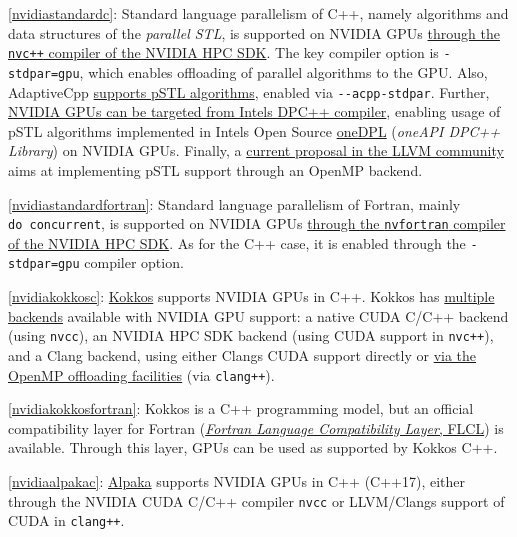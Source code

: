 \item \ref{nvidiastandardc}: Standard language parallelism of C++, namely algorithms and data structures of the \emph{parallel STL}, is supported on NVIDIA GPUs \href{https://docs.nvidia.com/hpc-sdk/compilers/c++-parallel-algorithms/index.html}{through the \texttt{nvc++} compiler of the NVIDIA HPC SDK}. The key compiler option is \texttt{-stdpar=gpu}, which enables offloading of parallel algorithms to the GPU. Also, AdaptiveCpp \href{https://github.com/AdaptiveCpp/AdaptiveCpp/blob/develop/doc/stdpar.md}{supports pSTL algorithms}, enabled via \texttt{-\/-acpp-stdpar}. Further, \href{https://intel.github.io/llvm-docs/GetStartedGuide.html\#build-dpc-toolchain-with-support-for-nvidia-cuda}{NVIDIA GPUs can be targeted from Intel\textquotesingle s DPC++ compiler}, enabling usage of pSTL algorithms implemented in Intel\textquotesingle s Open Source \href{https://github.com/oneapi-src/oneDPL}{oneDPL} (\emph{oneAPI DPC++ Library}) on NVIDIA GPUs. Finally, a \href{https://discourse.llvm.org/t/rfc-openmp-offloading-backend-for-c-parallel-algorithms/73468}{current proposal in the LLVM community} aims at implementing pSTL support through an OpenMP backend.
\item \ref{nvidiastandardfortran}: Standard language parallelism of Fortran, mainly \texttt{do\ concurrent}, is supported on NVIDIA GPUs \href{https://developer.nvidia.com/blog/accelerating-fortran-do-concurrent-with-gpus-and-the-nvidia-hpc-sdk/}{through the \texttt{nvfortran} compiler of the NVIDIA HPC SDK}. As for the C++ case, it is enabled through the \texttt{-stdpar=gpu} compiler option.
\item \ref{nvidiakokkosc}: \href{https://github.com/kokkos/kokkos}{Kokkos} supports NVIDIA GPUs in C++. Kokkos has \href{https://kokkos.github.io/kokkos-core-wiki/requirements.html}{multiple backends} available with NVIDIA GPU support: a native CUDA C/C++ backend (using \texttt{nvcc}), an NVIDIA HPC SDK backend (using CUDA support in \texttt{nvc++}), and a Clang backend, using either Clang\textquotesingle s CUDA support directly or \href{https://docs.nersc.gov/development/programming-models/kokkos/}{via the OpenMP offloading facilities} (via \texttt{clang++}).
\item \ref{nvidiakokkosfortran}: Kokkos is a C++ programming model, but an official compatibility layer for Fortran (\href{https://github.com/kokkos/kokkos-fortran-interop}{\emph{Fortran Language Compatibility Layer}, FLCL}) is available. Through this layer, GPUs can be used as supported by Kokkos C++.
\item \ref{nvidiaalpakac}: \href{https://github.com/alpaka-group/alpaka}{Alpaka} supports NVIDIA GPUs in C++ (C++17), either through the NVIDIA CUDA C/C++ compiler \texttt{nvcc} or LLVM/Clang\textquotesingle s support of CUDA in \texttt{clang++}.
